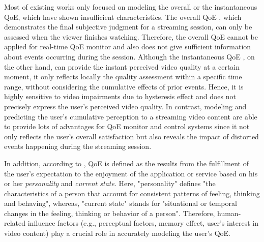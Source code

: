 Most of existing works only focused on modeling the overall or the instantaneous QoE, which have shown insufficient characteristics.
The overall QoE \cite{QoEModel_OP_EstimatingQoE, QoEModel_OP_DerivingValidatingUserExperience, QoEModel_OP_VideoQualityMetric}, which demonstrates the final subjective judgment for a streaming session, can only be assessed when the viewer finishes watching.
Therefore, the overall QoE cannot be applied for real-time QoE monitor and also does not give sufficient information about events occurring during the session.
Although the instantaneous QoE \cite{QoEModel_TimeVaryingSubjectiveQuality, QoeModel_ShortLongTermQualityModel}, on the other hand, can provide the instant perceived video quality at a certain moment, it only reflects locally the quality assessment within a specific time range, without considering the cumulative effects of prior events.
Hence, it is highly sensitive to video impairments due to hysteresis effect \cite{TemporalHysteresisModel, StallingEvents} and does not precisely express the user's perceived video quality.
In contrast, modeling and predicting the user's cumulative perception to a streaming video content are able to provide lots of advantages for QoE monitor and control systems since it not only reflects the user's overall satisfaction but also reveals the impact of distorted events happening during the streaming session.



In addition, according to \citep{QoEDef_Qualinet}, QoE is defined as the results from the fulfillment of the user's expectation to the enjoyment of the application or service based on his or her \textit{personality} and \textit{current state}.
Here, "personality" defines "the characteristics of a person that account for consistent patterns of feeling, thinking and behaving", whereas, "current state" stands for "situational or temporal changes in the feeling, thinking or behavior of a person".
Therefore, human-related influence factors (e.g., perceptual factors, memory effect, user's interest in video content) play a crucial role in accurately modeling the user's QoE.


